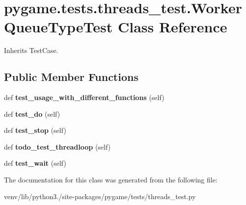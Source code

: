 \hypertarget{classpygame_1_1tests_1_1threads__test_1_1_worker_queue_type_test}{}\section{pygame.\+tests.\+threads\+\_\+test.\+Worker\+Queue\+Type\+Test Class Reference}
\label{classpygame_1_1tests_1_1threads__test_1_1_worker_queue_type_test}


Inherits Test\+Case.

\subsection*{Public Member Functions}
\begin{DoxyCompactItemize}
\item 
\mbox{\label{classpygame_1_1tests_1_1threads__test_1_1_worker_queue_type_test_aa9be355df295845c2b10a144325b5dbf}} 
def {\bfseries test\+\_\+usage\+\_\+with\+\_\+different\+\_\+functions} (self)
\item 
\mbox{\label{classpygame_1_1tests_1_1threads__test_1_1_worker_queue_type_test_a9faf150c98a389d4484b5b5e5e608aae}} 
def {\bfseries test\+\_\+do} (self)
\item 
\mbox{\label{classpygame_1_1tests_1_1threads__test_1_1_worker_queue_type_test_a20d497ef9610dfa646b76b5134c860da}} 
def {\bfseries test\+\_\+stop} (self)
\item 
\mbox{\label{classpygame_1_1tests_1_1threads__test_1_1_worker_queue_type_test_a52c7a960fdf89de2e5efbf7dfd897b44}} 
def {\bfseries todo\+\_\+test\+\_\+threadloop} (self)
\item 
\mbox{\label{classpygame_1_1tests_1_1threads__test_1_1_worker_queue_type_test_aa3db2a4ce60b9d533a5ccbe1d8439a77}} 
def {\bfseries test\+\_\+wait} (self)
\end{DoxyCompactItemize}


The documentation for this class was generated from the following file\+:\begin{DoxyCompactItemize}
\item 
venv/lib/python3./site-\/packages/pygame/tests/threads\+\_\+test.\+py\end{DoxyCompactItemize}
